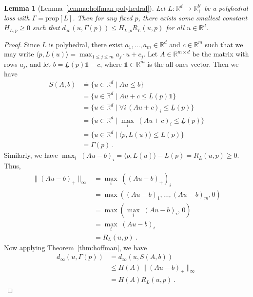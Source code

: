 \documentclass{article}
\newtheorem*{lemma*}{Lemma}
\theoremstyle{definition}\newtheorem{definition}{Definition}
\theoremstyle{definition}\newtheorem{assumption}{Assumption}
\newcommand{\reals}{\mathbb{R}}
\newcommand{\defeq}{\doteq}%
\newcommand{\prop}[1]{\mathrm{prop}[#1]}
\newcommand{\Y}{\mathcal{Y}}
\newcommand{\risk}[1]{\underline{#1}}
\newcommand{\inprod}[2]{\langle #1, #2 \rangle}%
\newcommand{\ones}{\mathds{1}}  %
\newcommand{\regret}[3]{R_{#1}(#2,#3)}
\begin{document}
\begin{lemma*}[Lemma~\ref{lemma:hoffman-polyhedral}]
  Let $L: \reals^d \to \reals_+^{\Y}$ be a polyhedral loss with $\Gamma = \prop{L}$.
  Then for any fixed $p$, there exists some smallest constant $H_{L,p} \geq 0$ such that $d_{\infty}(u,\Gamma(p)) \leq H_{L,p} R_L(u,p)$ for all $u \in \reals^d$.
\end{lemma*}
\begin{proof}
  Since $L$ is polyhedral, there exist $a_1,\ldots,a_m \in \reals^d$ and $c\in\reals^m$ such that we may write $\inprod{p}{L(u)} = \max_{1\leq j\leq m} a_j \cdot u + c_j$.
  Let $A \in \reals^{m\times d}$ be the matrix with rows $a_j$, and let $b = \risk{L}(p)\ones - c$, where $\ones\in\reals^m$ is the all-ones vector.
  Then we have
  \begin{align*}
    S(A,b)
    &\defeq \{u\in\reals^d \mid A u \leq b\}
    \\
    &= \{u\in\reals^d \mid A u + c \leq \risk{L}(p)\ones\}
    \\
    &= \{u\in\reals^d \mid \forall i\, (A u + c)_i \leq \risk{L}(p)\}
    \\
    &= \{u\in\reals^d \mid \max_i \;(A u + c)_i \leq \risk{L}(p)\}
    \\
    &= \{u\in\reals^d \mid \inprod{p}{L(u)} \leq \risk{L}(p)\}
    \\
    & = \Gamma(p)~.
  \end{align*}
  Similarly, we have $\max_i\; (A u - b)_i = \inprod{p}{L(u)} - \risk{L}(p) = \regret{L}{u}{p} \geq 0$.
  Thus,
  \begin{align*}
    \|(Au - b)_+\|_\infty
    &= \max_i\; ((Au - b)_+)_i
    \\
    &= \max((Au - b)_1,\ldots,(Au - b)_m, 0)
    \\
    &= \max(\max_i\; (Au - b)_i, \, 0)
    \\
    &= \max_i\; (Au - b)_i
    \\
    &= \regret{L}{u}{p}~.
  \end{align*}
  Now applying Theorem~\ref{thm:hoffman}, we have
  \begin{align*}
    d_\infty(u,\Gamma(p))
    &=    d_\infty(u,S(A,b))
    \\
    &\leq H(A) \|(Au-b)_+\|_\infty
    \\
    &= H(A) \regret{L}{u}{p}~.
  \end{align*}
\end{proof}
\end{document}
